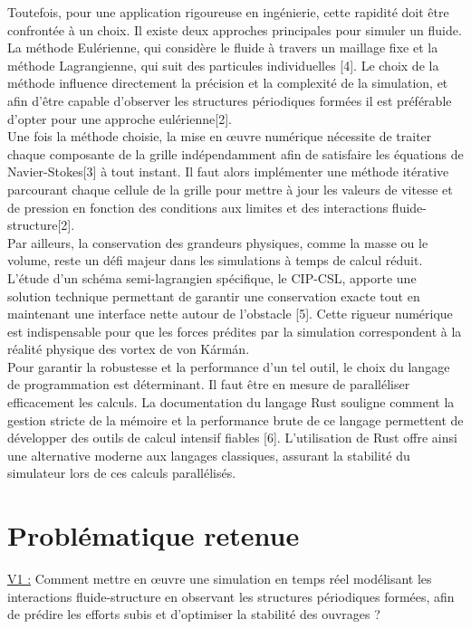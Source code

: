 \documentclass{article}
\begin{document}
Toutefois, pour une application rigoureuse en ingénierie, cette rapidité doit être confrontée 
à un choix. Il existe deux approches principales pour simuler un fluide. La méthode Eulérienne, qui 
considère le fluide à travers un maillage fixe et la méthode Lagrangienne, qui suit des particules
individuelles [4]. Le choix de la méthode influence directement la précision et la complexité
de la simulation, et afin d'être capable d'observer les structures périodiques formées il est
préférable d'opter pour une approche eulérienne[2].\\

Une fois la méthode choisie, la mise en œuvre numérique nécessite de traiter chaque 
composante de la grille indépendamment afin de satisfaire les équations de Navier-Stokes[3] à
tout instant. Il faut alors implémenter une méthode itérative parcourant chaque cellule de la
grille pour mettre à jour les valeurs de vitesse et de pression en fonction des conditions aux
limites et des interactions fluide-structure[2].\\

Par ailleurs, la conservation des grandeurs physiques, comme la masse ou le volume, reste un 
défi majeur dans les simulations à temps de calcul réduit. L'étude d'un schéma semi-lagrangien 
spécifique, le CIP-CSL, apporte une solution technique permettant de garantir une conservation 
exacte tout en maintenant une interface nette autour de l'obstacle [5]. Cette rigueur 
numérique est indispensable pour que les forces prédites par la simulation correspondent à la 
réalité physique des vortex de von Kármán.\\

Pour garantir la robustesse et la performance d'un tel outil, le choix du langage de 
programmation est déterminant. Il faut être en mesure de paralléliser efficacement les calculs. 
La documentation du langage Rust souligne comment la gestion stricte de la mémoire et la performance 
brute de ce langage permettent de développer des outils de calcul intensif fiables [6]. L'utilisation 
de Rust offre ainsi une alternative moderne aux langages classiques, assurant la stabilité du 
simulateur lors de ces calculs parallélisés.\\

  
\section*{Problématique retenue}

\underline{\color{green!70!black}V1 :} Comment mettre en œuvre une simulation en temps réel 
modélisant les interactions fluide-structure en observant les structures périodiques formées,
afin de prédire les efforts subis et d'optimiser la stabilité des ouvrages ?\\
\end{document}
